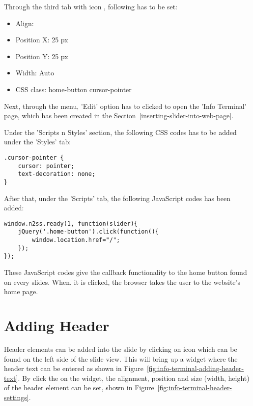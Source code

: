 Through the third tab with icon , following has to be set:
\begin{itemize}
\item Align: 
\item Position X: 25 px
\item Position Y: 25 px
\item Width: Auto
\item CSS class: home-button cursor-pointer
\end{itemize}

Next, through the  menu, 'Edit' option has to clicked to open the 'Info Terminal' page, which has been created in the Section~\ref{inserting-slider-into-web-page}.

Under the 'Scripts n Styles' section, the following CSS codes has to be added under the 'Styles' tab:
\begin{lstlisting}
.cursor-pointer {
	cursor: pointer;
	text-decoration: none;
}
\end{lstlisting}

After that, under the 'Scripts' tab, the following JavaScript codes has been added:
\begin{lstlisting}
window.n2ss.ready(1, function(slider){
	jQuery('.home-button').click(function(){
		window.location.href="/";
	});
});
\end{lstlisting}

These JavaScript codes give the callback functionality to the home button found on every slides. When, it is clicked, the browser takes the user to the website's home page.

\section{Adding Header} \label{sec:adding-header}
Header elements can be added into the slide by clicking on  icon which can be found on the left side of the slide view. This will bring up a widget where the header text can be entered as shown in Figure~\ref{fig:info-terminal-adding-header-text}. By click the  on the widget, the alignment, position and size (width, height) of the header element can be set, shown in Figure~\ref{fig:info-terminal-header-settings}.

